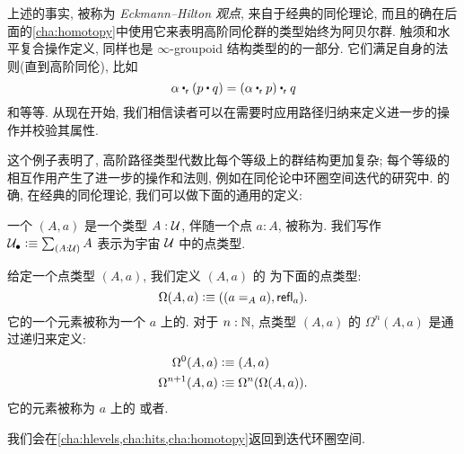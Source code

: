 上述的事实, 被称为 \emph{Eckmann–Hilton 观点}, 来自于经典的同伦理论, 而且的确在后面的\cref{cha:homotopy}中使用它来表明高阶同伦群的类型始终为阿贝尔群.
触须和水平复合操作定义, 同样也是 $\infty$-groupoid 结构类型的的一部分.
它们满足自身的法则(直到高阶同伦), 比如
\[
    \alpha \rightwhisker (p\ct q) = (\alpha \rightwhisker p) \rightwhisker q
\]
和等等.
从现在开始, 我们相信读者可以在需要时应用路径归纳来定义进一步的操作并校验其属性.

这个例子表明了, 高阶路径类型代数比每个等级上的群结构更加复杂;
每个等级的相互作用产生了进一步的操作和法则, 例如在同伦论中环圈空间迭代的研究中.
的确, 在经典的同伦理论, 我们可以做下面的通用的定义:

\begin{defn}
    \label{def:pointedtype}
    一个
    $(A,a)$ 是一个类型 $A:\type$, 伴随一个点 $a:A$, 被称为.
    我们写作 $\pointed{\type} \defeq \sm{A:\type} A$ 表示为宇宙 $\type$ 中的点类型.
\end{defn}

\begin{defn}
    \label{def:loopspace}
    给定一个点类型 $(A,a)$, 我们定义 $(A,a)$ 的
    为下面的点类型:
    \[\Omega(A,a)\defeq ((\id[A]aa),\refl a).\]
    它的一个元素被称为一个 $a$ 上的.
    对于 $n:\N$, 点类型 $(A,a)$ 的  $\Omega^{n}(A,a)$
    是通过递归来定义:
    \begin{align*}
        \Omega^0(A,a)&\defeq(A,a)\\
        \Omega^{n+1}(A,a)&\defeq\Omega^n(\Omega(A,a)).
    \end{align*}
    它的元素被称为 $a$ 上的
    或者.

\end{defn}

我们会在\cref{cha:hlevels,cha:hits,cha:homotopy}返回到迭代环圈空间.
%
%